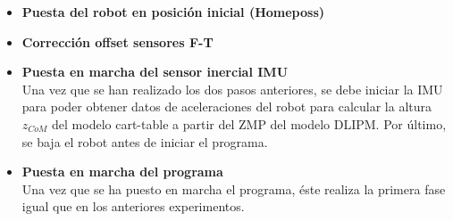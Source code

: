 \begin{itemize}
\item \textbf{Puesta del robot en posición inicial (Homeposs)}\\

\item \textbf{Corrección offset sensores F-T} 

\item \textbf{Puesta en marcha del sensor inercial IMU}\\ Una vez que se han realizado los dos pasos anteriores, se debe iniciar la IMU para poder obtener datos de aceleraciones del robot para calcular la altura $z_{CoM}$ del modelo cart-table a partir del ZMP del modelo DLIPM. Por último, se baja el robot antes de iniciar el programa.

\item \textbf{Puesta en marcha del programa}\\ Una vez que se ha puesto en marcha el programa, éste realiza la primera fase igual que en los anteriores experimentos. 
\end{itemize}




\afterpage{\null\newpage}
\newpage
